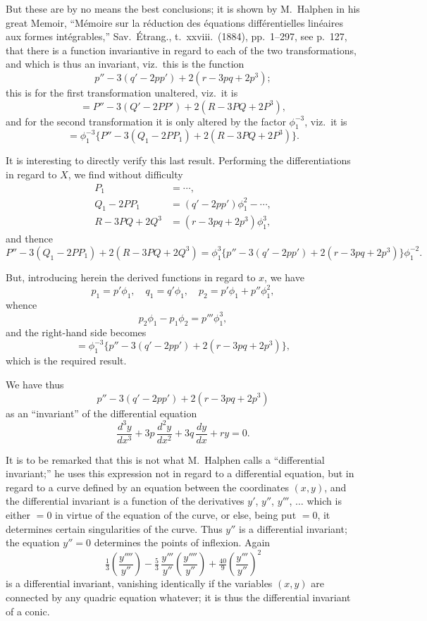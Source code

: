 \documentclass[11pt]{article}
\begin{document}
But these are by no means the best conclusions; it is shown by M.\ Halphen in his great Memoir, ``M\'emoire sur la r\'eduction des \'equations diff\'erentielles lin\'eaires aux formes int\'egrables,'' Sav.\ \'Etrang., t.\ xxviii.\ (1884), pp.\ 1--297, see p.\ 127, that there is a function invariantive in regard to each of the two transformations, and which is thus an invariant, viz.\ this is the function
\[
p'' - 3(q' - 2pp') + 2(r - 3pq + 2p^3);
\]
this is for the first transformation unaltered, viz.\ it is
\[
= P'' - 3(Q' - 2PP') + 2(R - 3PQ + 2P^3),
\]
and for the second transformation it is only altered by the factor $\phi_1^{-3}$, viz.\ it is
\[
= \phi_1^{-3}\{P'' - 3(Q_1 - 2PP_1) + 2(R - 3PQ + 2P^3)\}.
\]

It is interesting to directly verify this last result. Performing the differentiations in regard to $X$, we find without difficulty
\begin{align*}
P_1 &= \dotsb,\\
Q_1 - 2PP_1 &= (q' - 2pp')\phi_1^2 - \dotsb,\\
R - 3PQ + 2Q^3 &= (r - 3pq + 2p^3)\phi_1^3,
\end{align*}
and thence
\[
P'' - 3(Q_1 - 2PP_1) + 2(R - 3PQ + 2Q^3) = \phi_1^3\{p'' - 3(q' - 2pp') + 2(r - 3pq + 2p^3)\}\phi_1^{-2}.
\]

But, introducing herein the derived functions in regard to $x$, we have
\[
p_1 = p'\phi_1,\quad q_1 = q'\phi_1,\quad p_2 = p'\phi_1 + p''\phi_1^2,
\]
whence
\[
p_2\phi_1 - p_1\phi_2 = p'''\phi_1^3,
\]
and the right-hand side becomes
\[
= \phi_1^{-3}\{p'' - 3(q' - 2pp') + 2(r - 3pq + 2p^3)\},
\]
which is the required result.

\medskip

\noindent We have thus
\[
p'' - 3(q' - 2pp') + 2(r - 3pq + 2p^3)
\]
as an ``invariant'' of the differential equation
\[
\frac{d^3y}{dx^3} + 3p\,\frac{d^2y}{dx^2} + 3q\,\frac{dy}{dx} + ry = 0.
\]

It is to be remarked that this is not what M.\ Halphen calls a ``differential invariant;'' he uses this expression not in regard to a differential equation, but in regard to a curve defined by an equation between the coordinates $(x,y)$, and the differential invariant is a function of the derivatives $y'$, $y''$, $y'''$, $\dotsc$ which is either $=0$ in virtue of the equation of the curve, or else, being put $=0$, it determines certain singularities of the curve. Thus $y''$ is a differential invariant; the equation $y''=0$ determines the points of inflexion. Again
\[
\tfrac{1}{3}\!\left(\frac{y''''}{y''}\right) - \tfrac{5}{3}\,\frac{y'''}{y''}\!\left(\frac{y''''}{y''}\right) + \tfrac{40}{9}\!\left(\frac{y'''}{y''}\right)^{\!2}
\]
is a differential invariant, vanishing identically if the variables $(x,y)$ are connected by any quadric equation whatever; it is thus the differential invariant of a conic.
\end{document}
